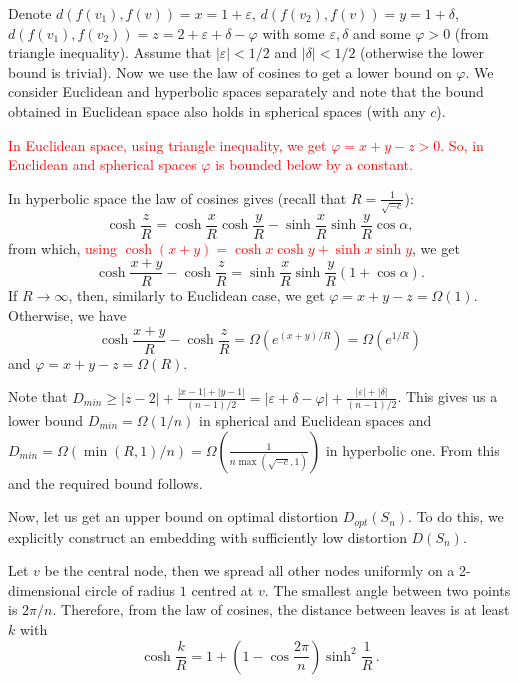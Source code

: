 \documentclass{article} %
\newcommand{\lt}[1]{\textcolor{red}{#1}}
\begin{document}
Denote $d(f(v_1),f(v)) = x = 1 + \varepsilon$, $d(f(v_2),f(v)) = y = 1 + \delta$, $d(f(v_1),f(v_2)) = z = 2 + \varepsilon + \delta - \varphi$ with some $\varepsilon, \delta$ and some $\varphi > 0$ (from triangle inequality). Assume that $|\varepsilon| < 1/2$ and $|\delta| < 1/2$ (otherwise the lower bound is trivial). Now we use the law of cosines to get a lower bound on $\varphi$.
We consider Euclidean and hyperbolic spaces separately and note that the bound obtained in Euclidean space also holds in spherical spaces (with any $c$).

\textcolor{red}{In Euclidean space, using triangle inequality, we get  $\varphi = x + y - z > 0$. So, in Euclidean and spherical spaces $\varphi$ is bounded below by a constant.}

In hyperbolic space the law of cosines gives 
(recall that $R = \frac{1}{\sqrt{-c}}$):
\[
\cosh \frac{z}{R} = \cosh \frac{x}{R} \cosh \frac{y}{R} - \sinh \frac{x}{R} \sinh \frac{y}{R} \cos \alpha,
\]
from which, \lt{using $\cosh(x+y) =\cosh x\cosh y+\sinh x\sinh y$}, we get 
\[
\cosh \frac{x+y}{R} - \cosh \frac{z}{R} = \sinh \frac{x}{R} \sinh \frac{y}{R} (1 + \cos \alpha). %
\]
If $R \to \infty$, then, similarly to Euclidean case, we get $\varphi = x + y - z = \Omega(1)$. Otherwise, we have
\[
\cosh \frac{x+y}{R} - \cosh \frac{z}{R} = \Omega\left(e^{(x+y)/R}\right) = \Omega\left(e^{1/R}\right)
\]
and
$\varphi = x + y - z = \Omega(R)$.

Note that $D_{min} \ge |z-2| + \frac{|x-1| + |y-1|}{(n-1)/2} =  |\varepsilon + \delta - \varphi| + \frac{|\varepsilon| + |\delta|}{(n-1)/2}$. This gives us a lower bound $D_{min} = \Omega(1/n)$ in spherical and Euclidean spaces and $D_{min} = \Omega(\min(R,1)/n) = \Omega\left(\frac{1}{n\max\left(\sqrt{-c},1\right)}\right)$ in hyperbolic one. From this and  the required bound follows.

Now, let us get an upper bound on optimal distortion $D_{opt}(S_n)$. To do this, we explicitly construct an embedding with sufficiently low distortion $D(S_n)$.

Let $v$ be the central node, then we spread all other nodes uniformly on a 2-dimensional circle of radius $1$ centred at $v$. The smallest angle between two points is $2 \pi / n$. Therefore, from the law of cosines, the distance between leaves is at least $k$ with
\[
\cosh \frac{k}{R} = 1  + \left(1 -  \cos \frac{2 \pi}{n}\right)  \sinh^2 \frac{1}{R} \,.
\]
\end{document}
